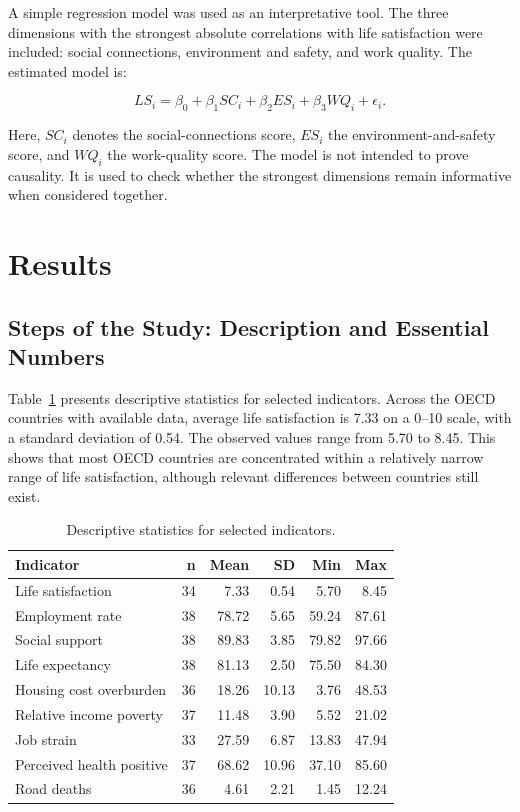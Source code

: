\documentclass[11pt,a4paper]{article}
\begin{document}
A simple regression model was used as an interpretative tool. The three dimensions with the strongest absolute correlations with life satisfaction were included: social connections, environment and safety, and work quality. The estimated model is:

\[
 LS_i = \beta_0 + \beta_1 SC_i + \beta_2 ES_i + \beta_3 WQ_i + \epsilon_i.
\]

Here, $SC_i$ denotes the social-connections score, $ES_i$ the environment-and-safety score, and $WQ_i$ the work-quality score. The model is not intended to prove causality. It is used to check whether the strongest dimensions remain informative when considered together.

\section{Results}

\subsection{Steps of the Study: Description and Essential Numbers}

Table~\ref{tab:desc} presents descriptive statistics for selected indicators. Across the OECD countries with available data, average life satisfaction is 7.33 on a 0--10 scale, with a standard deviation of 0.54. The observed values range from 5.70 to 8.45. This shows that most OECD countries are concentrated within a relatively narrow range of life satisfaction, although relevant differences between countries still exist.

\begin{table}[H]
\centering
\caption{Descriptive statistics for selected indicators.}
\label{tab:desc}
\begin{tabular}{lrrrrr}
\toprule
Indicator & n & Mean & SD & Min & Max \\
\midrule
Life satisfaction & 34 & 7.33 & 0.54 & 5.70 & 8.45 \\
Employment rate & 38 & 78.72 & 5.65 & 59.24 & 87.61 \\
Social support & 38 & 89.83 & 3.85 & 79.82 & 97.66 \\
Life expectancy & 38 & 81.13 & 2.50 & 75.50 & 84.30 \\
Housing cost overburden & 36 & 18.26 & 10.13 & 3.76 & 48.53 \\
Relative income poverty & 37 & 11.48 & 3.90 & 5.52 & 21.02 \\
Job strain & 33 & 27.59 & 6.87 & 13.83 & 47.94 \\
Perceived health positive & 37 & 68.62 & 10.96 & 37.10 & 85.60 \\
Road deaths & 36 & 4.61 & 2.21 & 1.45 & 12.24 \\
\bottomrule
\end{tabular}
\end{table}
\end{document}
